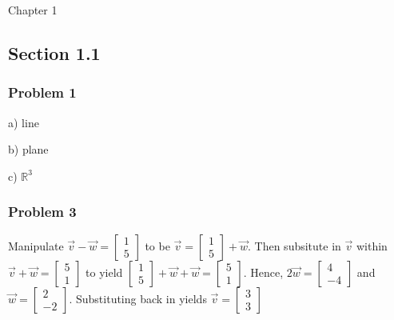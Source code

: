 \documentclass[12pt]{article}
\begin{document}
\begin{center}
    Chapter 1
\end{center}

\subsection*{Section 1.1}

\subsubsection*{Problem 1}
a) line

\noindent b) plane

\noindent c) $\mathbb{R}^3$

\subsubsection*{Problem 3}
Manipulate $\vec{v} - \vec{w} = \begin{bmatrix} 1 \\ 5 \end{bmatrix}$ to be 
$\vec{v} = \begin{bmatrix} 1 \\ 5 \end{bmatrix} + \vec{w}$. Then subsitute in $\vec{v}$ 
within $\vec{v} + \vec{w} = \begin{bmatrix} 5 \\ 1 \end{bmatrix}$ to yield 
$\begin{bmatrix} 1 \\ 5 \end{bmatrix} + \vec{w} + \vec{w} = \begin{bmatrix} 5 \\ 1 \end{bmatrix}$. 
Hence, $2\vec{w} = \begin{bmatrix} 4 \\ -4 \end{bmatrix}$ and 
$\vec{w} = \begin{bmatrix} 2 \\ -2 \end{bmatrix}$. Substituting back in yields
$\vec{v} = \begin{bmatrix} 3 \\ 3 \end{bmatrix}$
\end{document}
